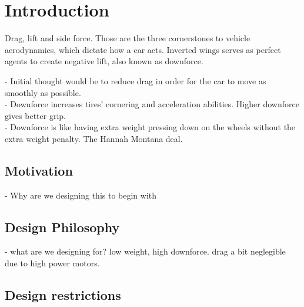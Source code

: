 \chapter{Introduction}
Drag, lift and side force. Those are the three cornerstones to vehicle aerodynamics, which dictate how a car acts. Inverted wings serves as perfect agents to create negative lift, also known as downforce.

- Initial thought would be to reduce drag in order for the car to move as smoothly as possible. \cite{jkatz}\\
- Downforce increases tires' cornering and acceleration abilities. Higher downforce gives better grip.\\
- Downforce is like having extra weight pressing down on the wheels without the extra weight penalty. The Hannah Montana deal.

\section{Motivation}
- Why are we designing this to begin with

\section{Design Philosophy}
- what are we designing for? low weight, high downforce. drag a bit neglegible due to high power motors.

\section{Design restrictions} %

